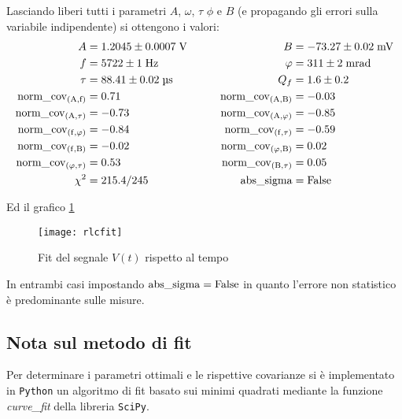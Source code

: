 \documentclass[a4paper, 12pt, italian]{article}
\begin{document}
Lasciando liberi tutti i parametri $A$, $\omega$, $\tau$ $\phi$ e $B$
(e propagando gli errori sulla variabile indipendente) si ottengono i valori:
\begin{align*}
A &= 1.2045 \pm 0.0007  \; \si{\volt} \qquad &B &= -73.27 \pm 0.02 \;
\si{m\volt} \\
f &= 5722 \pm 1 \; \si{\hertz} \qquad &\phi &= 311 \pm 2 \; \si{m\radian} \\  
\tau &= 88.41 \pm 0.02 \; \si{\us} \qquad &Q_f &= 1.6 \pm 0.2 \\
\rm{norm\_cov_{(A, f)}} &= 0.71 \qquad &\rm{norm\_cov_{(A, B)}} &= -0.03 \\
\rm{norm\_cov_{(A, \tau)}} &= -0.73 \qquad &\rm{norm\_cov_{(A, \phi)}} &= -0.85 \\ 
\rm{norm\_cov_{(f, \phi)}} &= -0.84 \qquad &\rm{norm\_cov_{(f, \tau)}} &= -0.59 \\
\rm{norm\_cov_{(f, B)}} &= -0.02 \qquad &\rm{norm\_cov_{(\phi, B)}} &= 0.02 \\
\rm{norm\_cov_{(\phi, \tau)}} &= 0.53 \qquad &\rm{norm\_cov_{(B, \tau)}} &= 0.05 \\
\chi^2 &= 215.4/245 \qquad &\rm{abs\_sigma} &= \rm False
\end{align*}

Ed il grafico \ref{plt:rlcfit}\\
\begin{figure}[!htb]
	\centering 
 		\texttt{[image: rlcfit]}
    \caption{Fit del segnale $V(t)$ rispetto al tempo \label{plt:rlcfit}}
\end{figure}
In entrambi casi impostando $\rm{abs\_sigma} = \rm False$ in quanto l'errore
non statistico è predominante sulle misure.

%

\subsection{Nota sul metodo di fit}
Per determinare i parametri ottimali e le rispettive covarianze si \`e
implementato in \verb+Python+ un algoritmo di fit basato sui minimi quadrati
mediante la funzione \emph{curve\_fit} della libreria 
\texttt{SciPy}\cite{scipy}.
\end{document}

